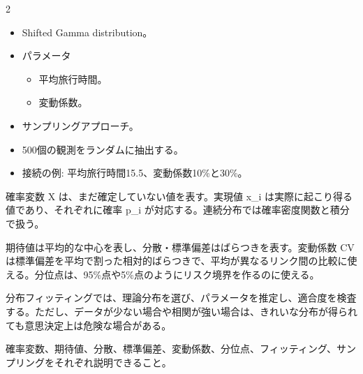 \begin{multicols}{2}

\footnotesize

\raggedcolumns


\begin{itemize}
\item Shifted Gamma distribution。
\item パラメータ
\begin{itemize}
\item 平均旅行時間。
\item 変動係数。
\end{itemize}
\item サンプリングアプローチ。
\item 500個の観測をランダムに抽出する。
\item 接続の例: 平均旅行時間15.5、変動係数10\%と30\%。
\end{itemize}

確率変数 X は、まだ確定していない値を表す。実現値 x\_i は実際に起こり得る値であり、それぞれに確率 p\_i が対応する。連続分布では確率密度関数と積分で扱う。\par

期待値は平均的な中心を表し、分散・標準偏差はばらつきを表す。変動係数 CV は標準偏差を平均で割った相対的ばらつきで、平均が異なるリンク間の比較に使える。分位点は、95\%点や5\%点のようにリスク境界を作るのに使える。\par

分布フィッティングでは、理論分布を選び、パラメータを推定し、適合度を検査する。ただし、データが少ない場合や相関が強い場合は、きれいな分布が得られても意思決定上は危険な場合がある。\par

確率変数、期待値、分散、標準偏差、変動係数、分位点、フィッティング、サンプリングをそれぞれ説明できること。\par



\end{multicols}
